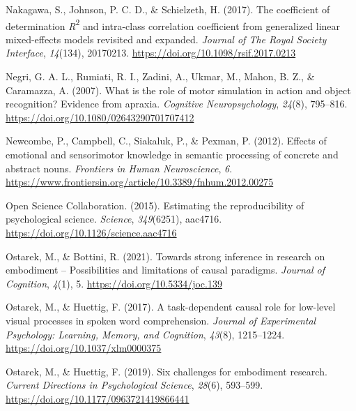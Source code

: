 \documentclass[
  12pt,
  man,floatsintext]{apa7}
\newlength{\cslhangindent}
\newlength{\cslentryspacingunit} %
\newenvironment{CSLReferences}[2] %
 {%
  \setlength{\parindent}{0pt}
  \ifodd #1
  \let\oldpar\par
  \def\par{\hangindent=\cslhangindent\oldpar}
  \fi
  \setlength{\parskip}{#2\cslentryspacingunit}
 }%
 {}
\begin{document}
\begin{CSLReferences}{1}{0}
\leavevmode{}%
Nakagawa, S., Johnson, P. C. D., \& Schielzeth, H. (2017). The coefficient of determination {\emph{R}}{\textsuperscript{2}} and intra-class correlation coefficient from generalized linear mixed-effects models revisited and expanded. \emph{Journal of The Royal Society Interface}, \emph{14}(134), 20170213. \url{https://doi.org/10.1098/rsif.2017.0213}

\leavevmode{}%
Negri, G. A. L., Rumiati, R. I., Zadini, A., Ukmar, M., Mahon, B. Z., \& Caramazza, A. (2007). What is the role of motor simulation in action and object recognition? {Evidence} from apraxia. \emph{Cognitive Neuropsychology}, \emph{24}(8), 795--816. \url{https://doi.org/10.1080/02643290701707412}

\leavevmode{}%
Newcombe, P., Campbell, C., Siakaluk, P., \& Pexman, P. (2012). Effects of emotional and sensorimotor knowledge in semantic processing of concrete and abstract nouns. \emph{Frontiers in Human Neuroscience}, \emph{6}. \url{https://www.frontiersin.org/article/10.3389/fnhum.2012.00275}

\leavevmode{}%
Open Science Collaboration. (2015). Estimating the reproducibility of psychological science. \emph{Science}, \emph{349}(6251), aac4716. \url{https://doi.org/10.1126/science.aac4716}

\leavevmode{}%
Ostarek, M., \& Bottini, R. (2021). Towards strong inference in research on embodiment -- {Possibilities} and limitations of causal paradigms. \emph{Journal of Cognition}, \emph{4}(1), 5. \url{https://doi.org/10.5334/joc.139}

\leavevmode{}%
Ostarek, M., \& Huettig, F. (2017). A task-dependent causal role for low-level visual processes in spoken word comprehension. \emph{Journal of Experimental Psychology: Learning, Memory, and Cognition}, \emph{43}(8), 1215--1224. \url{https://doi.org/10.1037/xlm0000375}

\leavevmode{}%
Ostarek, M., \& Huettig, F. (2019). Six challenges for embodiment research. \emph{Current Directions in Psychological Science}, \emph{28}(6), 593--599. \url{https://doi.org/10.1177/0963721419866441}


\end{CSLReferences}
\end{document}
